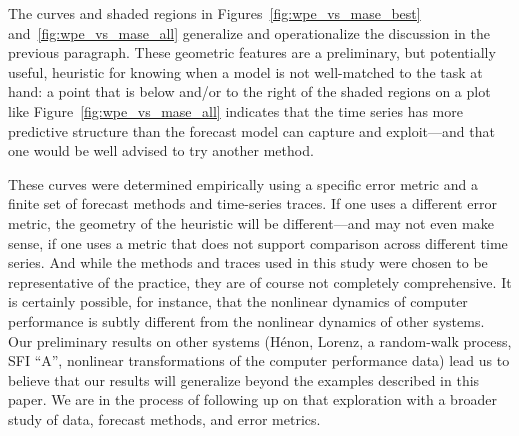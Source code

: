 \documentclass[%
pre,
reprint,
superscriptaddress,
showpacs,
nofootinbib,
nobibnotes,
 amsmath,amssymb,
 aps,
]{revtex4-1}
\newcommand{\alert}[1]{{\color{red}#1}}
\begin{document}
The curves and shaded regions in Figures~\ref{fig:wpe_vs_mase_best}
and~\ref{fig:wpe_vs_mase_all} generalize and operationalize the
discussion in the previous paragraph.  These geometric features are a
preliminary, but potentially useful, heuristic for knowing when a
model is not well-matched to the task at hand: a point that is below
and/or to the right of the shaded regions on a plot like
Figure~\ref{fig:wpe_vs_mase_all} indicates that the time series has
more predictive structure than the forecast model can capture and
exploit---and that one would be well advised to try another method.

These curves were determined empirically using a specific error metric
and a finite set of forecast methods and time-series traces.  If one
uses a different error metric, the geometry of the heuristic will be
different---and may not even make sense, if one uses a metric that
does not support comparison across different time series.  And while
the methods and traces used in this study were chosen to be
representative of the practice, they are of course not completely
comprehensive.  It is certainly possible, for instance, that the
nonlinear dynamics of computer performance is subtly different from
the nonlinear dynamics of other systems.  Our preliminary results on
other systems (H\'enon, Lorenz, a random-walk process, SFI ``A'',
nonlinear transformations of the computer performance data) lead us to believe
that our results will generalize beyond the examples described in this
paper.  We are in the process of following up on that exploration with
a broader study of data, forecast methods, and error metrics.

%
\end{document}
